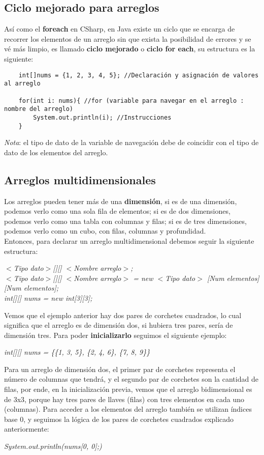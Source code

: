 \subsection{Ciclo mejorado para arreglos}
Así como el \textbf{foreach} en CSharp, en Java existe un ciclo que se encarga de recorrer los elementos de un arreglo sin que exista la posibilidad de errores y se vé más limpio, es llamado \textbf{ciclo mejorado} o \textbf{ciclo for each}, su estructura es la siguiente:
\begin{lstlisting}
    int[]nums = {1, 2, 3, 4, 5}; //Declaración y asignación de valores al arreglo
        
    for(int i: nums){ //for (variable para navegar en el arreglo : nombre del arreglo)
        System.out.println(i); //Instrucciones
    }
\end{lstlisting}
\textit{Nota}: el tipo de dato de la variable de navegación debe de coincidir con el tipo de dato de los elementos del arreglo.

\subsection{Arreglos multidimensionales}
Los arreglos pueden tener más de una \textbf{dimensión}, si es de una dimensión, podemos verlo como una sola fila de elementos; si es de dos dimensiones, podemos verlo como una tabla con columnas y filas; si es de tres dimensiones, podemos verlo como un cubo, con filas, columnas y profundidad.\\
Entonces, para declarar un arreglo multidimensional debemos seguir la siguiente estructura:\begin{center}\textit{$<$Tipo dato$>$[][] $<$Nombre arreglo$>$;\\$<$Tipo dato$>$[][] $<$Nombre arreglo$>$ = new $<$Tipo dato$>$ [Num elementos][Num elementos];\\int[][] nums = new int[3][3];}\end{center}
Vemos que el ejemplo anterior hay dos pares de corchetes cuadrados, lo cual significa que el arreglo es de dimensión dos, si hubiera tres pares, sería de dimensión tres. Para poder \textbf{inicializarlo} seguimos el siguiente ejemplo:\begin{center}\textit{int[][] nums = \{\{1, 3, 5\}, \{2, 4, 6\}, \{7, 8, 9\}\}}\end{center}
Para un arreglo de dimensión dos, el primer par de corchetes representa el número de columnas que tendrá, y el segundo par de corchetes son la cantidad de filas, por ende, en la inicialización previa, vemos que el arreglo bidimensional es de 3x3, porque hay tres pares de llaves (filas) con tres elementos en cada uno (columnas).
Para acceder a los elementos del arreglo también se utilizan índices base 0, y seguimos la lógica de los pares de corchetes cuadrados explicado anteriormente:\begin{center}\textit{System.out.println(nums[0, 0];)}\end{center}